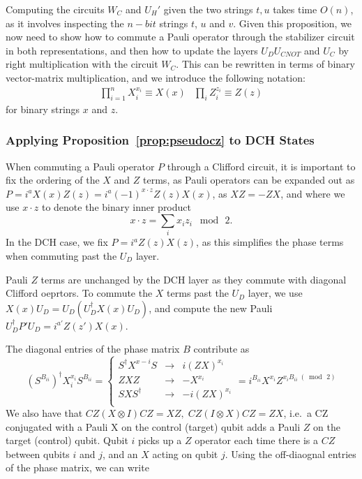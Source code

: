 Computing the circuits $W_{C}$ and $U_{H}'$ given the two strings $t,u$ takes time $O(n)$, as it involves inspecting the $n-bit$ strings $t$, $u$ and $v$. Given this proposition, we now need to show how to commute a Pauli operator through the stabilizer circuit in both representations, and then how to update the layers $U_{D}U_{CNOT}$ and $U_{C}$ by right multiplication with the circuit $W_{C}$. This can be rewritten in terms of binary vector-matrix multiplication, and we introduce the following notation:
\[
\begin{array}{lr}
\prod_{i=1}^{n}X_{i}^{x_{i}} \equiv X(x) & \prod_{i}Z_{i}^{z_{i}} \equiv Z(z)
\end{array}
\]
for binary strings $x$ and $z$.
\subsubsection*{Applying Proposition~\ref{prop:pseudocz} to DCH States}
When commuting a Pauli operator $P$ through a Clifford circuit, it is important to fix the ordering of the $X$ and $Z$ terms, as Pauli operators can be expanded out as $P=i^{a}X(x)Z(z) = i^{a}(-1)^{x\cdot z}Z(z)X(x)$, as $XZ=-ZX$, and where we use $x\cdot z$ to denote the binary inner product
\[x\cdot z = \sum_{i}x_{i}z_{i}\;\bmod\,2.\]
In the DCH case, we fix $P=i^{a}Z(z)X(z)$, as this simplifies the phase terms when commuting past the $U_{D}$ layer.\par
Pauli $Z$ terms are unchanged by the DCH layer as they commute with diagonal Clifford oeprtors. To commute the $X$ terms past the $U_{D}$ layer, we use $X(x)U_{D} = U_{D}\left(U_{D}^{\dagger}X(x)U_{D}\right)$, and compute the new Pauli $U_{D}^{\dagger}P'U_{D}=i^{a'}Z(z')X(x)$.\par
The diagonal entries of the phase matrix $B$ contribute as
\[(S^{B_{ii}})^{\dagger} X_{i}^{x_{i}} S^{B_{ii}} = \left\{
\begin{array}{rcl}
S^{\dagger}X^{x-{i}} S & \rightarrow & i(ZX)^{x_{i}} \\
ZXZ & \rightarrow & -X^{x_{i}}\\
SXS^{\dagger} & \rightarrow & -i (ZX)^{x_{i}}\\
\end{array} = i^{B_{ii}}X^{x_{i}}Z^{x_{i}B_{ii}\;(\bmod\,2)}
\right.\]
We also have that $CZ (X\otimes I) CZ = XZ,\;CZ(I\otimes X)CZ=ZX$, i.e.~a CZ conjugated with a Pauli X on the control (target) qubit adds a Pauli $Z$ on the target (control) qubit. Qubit $i$ picks up a $Z$ operator each time there is a $CZ$ between qubits $i$ and $j$, and an $X$ acting on qubit $j$. Using the off-diaognal entries of the phase matrix, we can write
